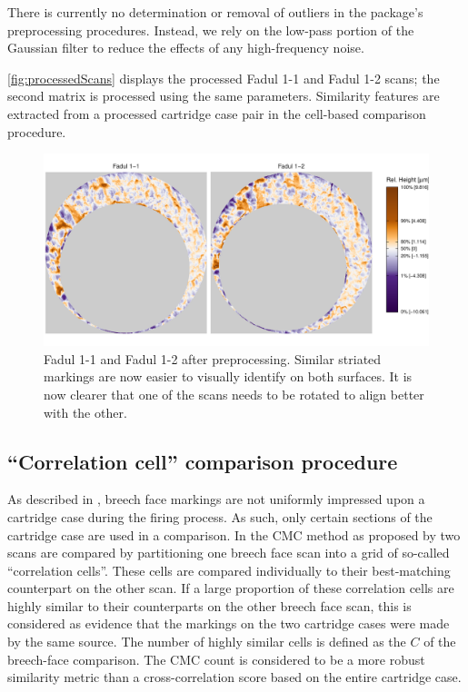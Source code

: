 There is currently no determination or removal of outliers in the
 package's preprocessing procedures. Instead, we rely on
the low-pass portion of the Gaussian filter to reduce the effects of any
high-frequency noise.

\autoref{fig:processedScans} displays the processed Fadul 1-1 and Fadul
1-2 scans; the second matrix is processed using the same parameters.
Similarity features are extracted from a processed cartridge case pair
in the cell-based comparison procedure.

\begin{Schunk}
\begin{figure}[htbp]

{\centering \includegraphics[width=\textwidth]{figures/cmcr-unnamed-chunk-10-1} 

}

\caption{\label{fig:processedScans} Fadul 1-1 and Fadul 1-2 after preprocessing. Similar striated markings are now easier to visually identify on both surfaces. It is now clearer that one of the scans needs to be rotated to align better with the other.}\label{fig:unnamed-chunk-10}
\end{figure}
\end{Schunk}

\hypertarget{comparisonProcedure}{%
\subsection{``Correlation cell'' comparison
procedure}\label{comparisonProcedure}}

As described in \citet{song_proposed_2013}, breech face markings are not
uniformly impressed upon a cartridge case during the firing process. As
such, only certain sections of the cartridge case are used in a
comparison. In the CMC method as proposed by \citet{song_proposed_2013}
two scans are compared by partitioning one breech face scan into a grid
of so-called ``correlation cells''. These cells are compared
individually to their best-matching counterpart on the other scan. If a
large proportion of these correlation cells are highly similar to their
counterparts on the other breech face scan, this is considered as
evidence that the markings on the two cartridge cases were made by the
same source. The number of highly similar cells is defined as the
 \(C\) \citep{song_proposed_2013} of the breech-face
comparison. The CMC count is considered to be a more robust similarity
metric than a cross-correlation score based on the entire cartridge
case.

